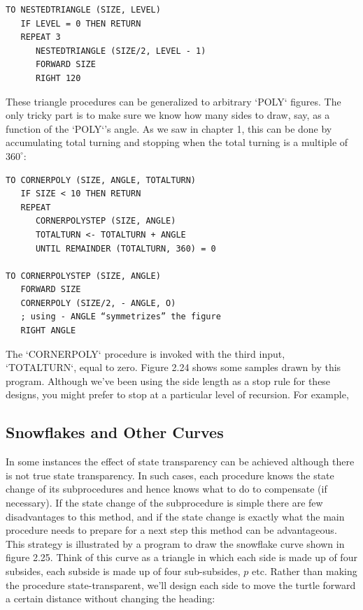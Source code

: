 \documentclass{book}
\begin{document}
\begin{verbatim}
TO NESTEDTRIANGLE (SIZE, LEVEL)
   IF LEVEL = 0 THEN RETURN
   REPEAT 3
      NESTEDTRIANGLE (SIZE/2, LEVEL - 1)
      FORWARD SIZE
      RIGHT 120
\end{verbatim}
These triangle procedures can be generalized to arbitrary \textsc{`POLY`} figures.
The only tricky part is to make sure we know how many sides to draw,
say, as a function of the \textsc{`POLY`}'s angle. As we saw in chapter 1, this
can be done by accumulating total turning and stopping when the total
turning is a multiple of $360^{\circ}$:

\begin{verbatim}
TO CORNERPOLY (SIZE, ANGLE, TOTALTURN)
   IF SIZE < 10 THEN RETURN
   REPEAT
      CORNERPOLYSTEP (SIZE, ANGLE)
      TOTALTURN <- TOTALTURN + ANGLE
      UNTIL REMAINDER (TOTALTURN, 360) = 0

TO CORNERPOLYSTEP (SIZE, ANGLE)
   FORWARD SIZE
   CORNERPOLY (SIZE/2, - ANGLE, O)
   ; using - ANGLE “symmetrizes” the figure
   RIGHT ANGLE
\end{verbatim}
The \textsc{`CORNERPOLY`} procedure is invoked with the third input, \textsc{`TOTALTURN`},
equal to zero. Figure 2.24 shows some samples drawn by this program.
Although we've been using the side length as a stop rule for these
designs, you might prefer to stop at a particular level of recursion. For
example,

\subsection{Snowflakes and Other Curves}

In some instances the effect of state transparency can be achieved although there is not true state transparency. In such cases, each procedure knows the state change of its subprocedures and hence knows
what to do to compensate (if necessary). If the state change of the subprocedure is simple there are few disadvantages to this method, and if
the state change is exactly what the main procedure needs to prepare
for a next step this method can be advantageous.
This strategy is illustrated by a program to draw the snowflake curve
shown in figure 2.25. Think of this curve as a triangle in which each side
is made up of four subsides, each subside is made up of four sub-subsides,
$p$ etc. Rather than making the procedure state-transparent, we'll design
each side to move the turtle forward a certain distance without changing
the heading:
\end{document}
